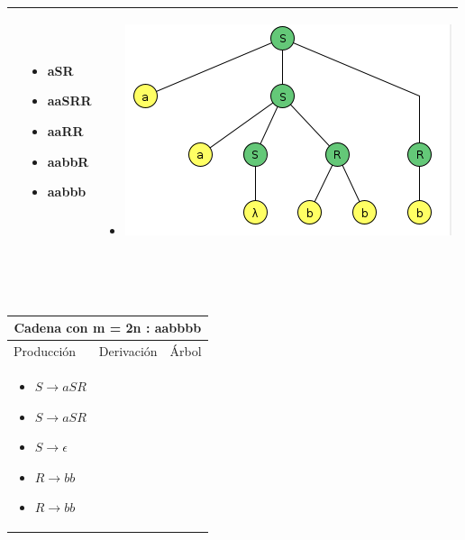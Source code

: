 \documentclass{article}
\begin{document}
\begin{enumerate} [(a)]
\begin{tabular}{|p{3.5cm}|p{3.5cm}|p{8cm}|  }
\begin{itemize}[label={}]
         
        \end{itemize}
        &
        \begin{itemize}[label={}]
             
             \item	aSR 
         \item	aaSRR 
         \item aaRR 
         \item aabbR 
         \item aabbb 
         
         
        \end{itemize}
        &
         \begin{itemize}[label={}]
             \item \includegraphics[scale=0.40]{img/2e-aabbb.png}
        \end{itemize}
        
         
         \\ \hline
        \end{tabular}
        \\ \\
        \begin{tabular}{|p{3.5cm}|p{3.5cm}|p{8cm}|  }
         \hline
         \multicolumn{3}{|c|}{Cadena con m = 2n : aabbbb} \\
         \hline
         Producción & Derivación & Árbol\\
         \hline
         
         \begin{itemize}[label={}]
             
             \item $ S \to aSR$ 
         \item $ S \to aSR$ 
         \item $ S \to \epsilon$ 
         \item $ R \to bb$	
         \item $ R \to bb$	
         

\end{itemize}
\end{tabular}
\end{enumerate}
\end{document}
